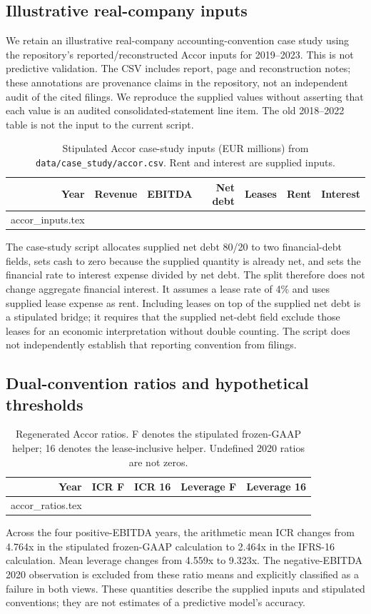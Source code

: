 \documentclass[11pt,a4paper]{article}
\makeatletter
\theoremstyle{plain}
\theoremstyle{definition}
\newcommand{\paperinput}[1]{\@@input\generatedpath#1 }
\makeatother
\begin{document}
\subsection{Illustrative real-company inputs}
We retain an illustrative real-company accounting-convention case study using
the repository's reported/reconstructed Accor inputs for 2019--2023. This is not
predictive validation. The CSV includes report, page and reconstruction notes;
these annotations are provenance claims in the repository, not an independent
audit of the cited filings. We reproduce the supplied values without asserting
that each value is an audited consolidated-statement line item. The old
2018--2022 table is not the input to the current script.

\begin{table}[H]\centering\small
\caption{Stipulated Accor case-study inputs (EUR millions) from
\texttt{data/case\_study/accor.csv}. Rent and interest are supplied inputs.}
\begin{tabular}{rrrrrrr}\toprule
Year & Revenue & EBITDA & Net debt & Leases & Rent & Interest\\\midrule
\paperinput{accor_inputs.tex}
\bottomrule\end{tabular}\label{tab:accor_data}\end{table}
The case-study script allocates supplied net debt 80/20 to two financial-debt
fields, sets cash to zero because the supplied quantity is already net, and sets
the financial rate to interest expense divided by net debt. The split therefore
does not change aggregate financial interest. It assumes a lease rate of 4\%
and uses supplied lease expense as rent. Including leases on top of the supplied
net debt is a stipulated bridge; it requires that the supplied net-debt field
exclude those leases for an economic interpretation without double counting.
The script does not independently establish that reporting convention from filings.

\subsection{Dual-convention ratios and hypothetical thresholds}
\begin{table}[H]\centering\small
\caption{Regenerated Accor ratios. F denotes the stipulated frozen-GAAP helper;
16 denotes the lease-inclusive helper. Undefined 2020 ratios are not zeros.}
\begin{tabular}{rrrrr}\toprule
Year & ICR F & ICR 16 & Leverage F & Leverage 16\\\midrule
\paperinput{accor_ratios.tex}
\bottomrule\end{tabular}\label{tab:accor_ratios}\end{table}
Across the four positive-EBITDA years, the arithmetic mean ICR changes from
4.764x in the stipulated frozen-GAAP calculation to 2.464x in the IFRS-16
calculation. Mean leverage changes from 4.559x to 9.323x. The negative-EBITDA
2020 observation is excluded from these ratio means and explicitly classified as
a failure in both views. These quantities describe the supplied inputs and
stipulated conventions; they are not estimates of a predictive model's accuracy.
\end{document}
